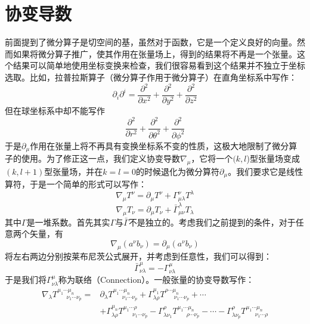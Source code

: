 \documentclass{ctexart}
\newcommand\non{\nonumber \\}
\begin{document}
\section{协变导数}
前面提到了微分算子是切空间的基，虽然对于函数，它是一个定义良好的向量。然而如果将微分算子推广，使其作用在张量场上，得到的结果将不再是一个张量。这个结果可以简单地使用坐标变换来检查，我们很容易看到这个结果并不独立于坐标选取。比如，拉普拉斯算子（微分算子作用于微分算子）在直角坐标系中写作：
\begin{equation}
\partial_i\partial^i=\frac{\partial^2}{\partial x^2}+\frac{\partial^2}{\partial y^2}+\frac{\partial^2}{\partial z^2}
\end{equation}
但在球坐标系中却不能写作
\begin{equation}
\frac{\partial^2}{\partial r^2}+\frac{\partial^2}{\partial \theta^2}+\frac{\partial^2}{\partial \phi^2}
\end{equation}
于是$\partial_\mu$作用在张量上将不再具有变换坐标系不变的性质，这极大地限制了微分算子的使用。为了修正这一点，我们定义协变导数$\nabla_\mu$，它将一个$(k,l$)型张量场变成$(k,l+1)$型张量场，并在$k=l=0$的时候退化为微分算符$\partial_\mu$。我们要求它是线性算符，于是一个简单的形式可以写作：
\begin{equation}
\nabla_\mu T^\nu=\partial_\mu T^\nu+\Gamma_{\mu\lambda}^\nu T^\lambda
\end{equation}
\begin{equation}
\nabla_\mu T_\nu=\partial_\mu T_\nu+\bar{\Gamma}_{\mu\nu}^\lambda T_\lambda
\end{equation}
其中$\Gamma$是一堆系数。首先其实$\Gamma$与$\bar{\Gamma}$不是独立的。考虑我们之前提到的条件，对于任意两个矢量，有
\begin{equation}
\nabla_\mu(a^\nu b_\nu)=\partial_\mu(a^\nu b_\nu)
\end{equation}
将左右两边分别按莱布尼茨公式展开，并考虑到任意性，我们可以得到：
\begin{equation}
\bar{\Gamma}^{\mu}_{\nu\lambda}=-\Gamma^{\mu}_{\nu\lambda}
\end{equation}
于是我们将$\Gamma^\mu_{\nu\lambda}$称为联络（Connection）。一般张量的协变导数写作：
\begin{align}
\nabla_{\lambda}T^{\mu_1\cdots\mu_n}_{\ \ \ \ \ \ \ \nu_1\cdots\nu_p}=&\partial_{\lambda}T^{\mu_1\cdots\mu_n}_{\ \ \ \ \ \ \ \nu_1\cdots\nu_p}+\Gamma^{\mu_1}_{\lambda\rho}T^{\rho\cdots\mu_n}_{\ \ \ \ \ \ \ \nu_1\cdots\nu_p}+\cdots\non
&+\Gamma^{\mu_n}_{\lambda\rho}T^{\mu_1\cdots\rho}_{\ \ \ \ \ \ \ \nu_1\cdots\nu_p}-\Gamma^\rho_{\lambda\nu_1}T^{\mu_1\cdots\mu_n}_{\ \ \ \ \ \ \ \rho\cdots\nu_p}-\cdots-\Gamma^\rho_{\lambda\nu_p}T^{\mu_1\cdots\mu_n}_{\ \ \ \ \ \ \ \nu_1\cdots\rho}
\end{align}
\end{document}

